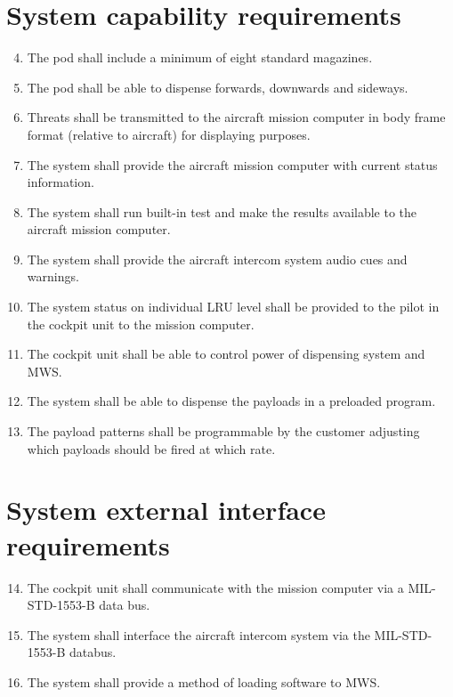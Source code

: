 \documentclass[Main]{subfiles}
\begin{document}
\section{System capability requirements}
\begin{enumerate}[{SR}-1]
\setcounter{enumi}{3}
\item The pod shall include a minimum of eight standard magazines.\label{SR-4}

\item The pod shall be able to dispense forwards, downwards and sideways. \label{SR-5}

\item Threats shall be transmitted to the aircraft mission computer in body frame format (relative to aircraft) for displaying purposes.\label{SR-6}

\item The system shall provide the aircraft mission computer with current status information.\label{SR-7}

\item The system shall run built-in test and make the results available to the aircraft mission computer.\label{SR-8}

\item The system shall provide the aircraft intercom system audio cues and warnings.\label{SR-9}

\item The system status on individual LRU level shall be provided to the pilot in the cockpit unit to the mission computer.\label{SR-10}

\item The cockpit unit shall be able to control power of dispensing system and MWS.\label{SR-11}

\item The system shall be able to dispense the payloads in a preloaded program. \label{SR-12}

\item The payload patterns shall be programmable by the customer adjusting which payloads should be fired at which rate.\label{SR-13}
\end{enumerate}

\section{System external interface requirements}

\begin{enumerate}[{SR}-1]
\setcounter{enumi}{13}
\item The cockpit unit shall communicate with the mission computer via a MIL-STD-1553-B data bus.\label{SR-14}

\item The system shall interface the aircraft intercom system via the MIL-STD-1553-B databus.\label{SR-15}

\item The system shall provide a method of loading software to MWS.\label{SR-16}
\end{enumerate}
\end{document}
